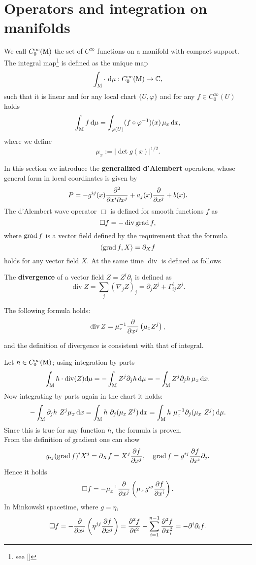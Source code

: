 \section{Operators and integration on manifolds}
\label{sec:operators}
We call $C_0^\infty(\mathrm{M})$ the set of $C^\infty$ functions on a manifold with compact support. The integral map\footnote{see [\citealp[Ch. A.3]{bar1}]} is defined as the unique map
\[	\int_{\mathrm{M}}\cdot\ \mathrm d\mu:C_0^\infty(\mathrm{M})\to {\mathbb C},	\]
such that it is linear and for any local chart $\{U,\varphi\}$ and for any $f\in C_0^\infty(U)$ holds
\[	\int_{\mathrm{M}}f\,\mathrm d\mu=\int_{\varphi(U)}(f\circ\varphi^{-1})(x)\,\mu_x\,\mathrm d x,		\]
where we define \begin{equation}
	\mu_x:=|\det g(x)|^{1/2}.
	\label{eq:mu}
\end{equation}

\noindent In this section we introduce the \textbf{generalized d'Alembert} operators, whose general form in local coordinates is given by
\begin{equation}
	P=-g^{ij}(x)\frac{\partial^2}{\partial x^i\partial x^j}+a_j(x)\frac{\partial }{\partial x^j}+b(x).
\end{equation}
The d'Alembert wave operator $\Box$ is defined for smooth functions $f$ as
\[	\Box f=-\operatorname{div}\operatorname{grad} f,	\]
where $\operatorname{grad} f$ is a vector field defined by the requirement that the formula $$\left\langle \operatorname{grad} f, X \right\rangle=\partial_X f$$ holds for any vector field $X$. At the same time $\operatorname{div}$ is defined as follows
\begin{definition}
	The \textbf{divergence} of a vector field $Z=Z^i\partial_i$ is defined as
	\[	\operatorname{div}Z=\sum_{j}(\nabla_j Z)_j=\partial_jZ^j+\Gamma_{ij}^iZ^j.	\]
\end{definition}

\begin{prop}
	The following formula holds:
	\begin{equation}
		\operatorname{div}Z=\mu_x^{-1}\frac{\partial }{\partial x^j}\left(\mu_xZ^j\right),
		\label{eq:divergence}
	\end{equation}
		
\noindent 	and the definition of divergence is consistent with that of integral.
\end{prop}
\Proof Let $h\in C_0^\infty(\mathrm{M})$; using integration by parts
\[	\int_{\mathrm{M}} h\cdot\operatorname{div}(Z)\mathrm d\mu=-\int_{\mathrm{M}} Z^j \partial_j h\,\mathrm d\mu = -\int_{\mathrm{M}} Z^j \partial_j h\, \mu_x\,\mathrm d x.	\]
Now integrating by parts again in the chart it holds:
\[	-\int_{\mathrm{M}} \partial_j h\  Z^j \mu_x\, \mathrm d x= \int_{\mathrm{M}} h\ \partial_j (\mu_x\, Z^j)\, \mathrm d x = \int_{\mathrm{M}} h\ \mu_x^{-1}\partial_j(\mu_x\ Z^j)\, \mathrm d\mu.		\]
Since this is true for any function $h$, the formula is proven.\endproof\\

\noindent From the definition of gradient one can show
\[g_{ij}(\operatorname{grad} f)^iX^j=\partial_X f=X^j\frac{\partial f}{\partial x^j},\quad \operatorname{grad} f=g^{ij}\frac{\partial f}{\partial x^i}\partial_j.\]
Hence it holds
\[	\Box f=-\mu_x^{-1}\frac{\partial }{\partial x^j}\left(\mu_x\, g^{ij}\frac{\partial f}{\partial x^i}\right).	\]
In Minkowski spacetime, where $g=\eta$,
\[	\Box f=-\frac{\partial }{\partial x^j}\left(\eta^{jj}\frac{\partial f}{\partial x^j}\right)=\frac{\partial^2f}{\partial t^2}-\sum_{i=1}^{n-1}\frac{\partial^2f}{\partial x_i^2}=-\partial^i\partial_if.		\]



